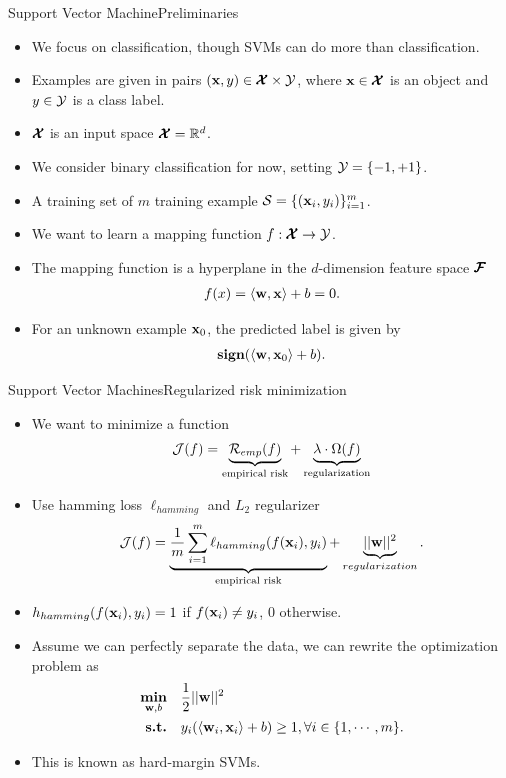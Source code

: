 \documentclass[first=dgreen,second=purple,logo=yellowexc]{aaltoslides}
\begin{document}
{\begin{frame}{Support Vector Machine}{Preliminaries}
	\begin{itemize}
		\item We focus on classification, though SVMs can do more than classification.
		\item Examples are given in pairs $(\mathbf {x},y)\in\pmb {\mathcal{X}}\times\mathcal{Y}$, where $\mathbf {x}\in\pmb {\mathcal{X}}$ is an object and $y\in\mathcal{Y}$ is a class label.
		\item $\pmb {\mathcal{X}}$ is an input space $\pmb {\mathcal{X}}=\mathbb{R}^d$.
		\item We consider binary classification for now, setting $\mathcal{Y}=\{-1,+1\}$.
		\item A training set of $m$ training example $\mathcal{S}=\{(\mathbf {x}_i,y_i)\}_{i=1}^{m}$.
		\item We want to learn a mapping function $f: \pmb {\mathcal{X}}\rightarrow\mathcal{Y}$.
		\item The mapping function is a hyperplane in the $d$-dimension feature space $\pmb {\mathcal{F}}$
		\begin{align*}
			f(x) = \langle \mathbf {w}, \mathbf {x} \rangle+b=0.
		\end{align*}
		\item For an unknown example $\mathbf {x}_0$, the predicted label is given by
		\begin{align*}
			\textbf{sign}(\langle \mathbf {w}, \mathbf {x}_0 \rangle+b).
		\end{align*}
	\end{itemize}
\end{frame}






\begin{frame}{Support Vector Machines}{Regularized risk minimization}
	\begin{itemize}
		\item We want to minimize a function
		\begin{align*}
			\mathcal{J}(f) = \underbrace{\mathcal{R}_{emp}(f)}_{\text{empirical risk}} + \underbrace{\lambda\cdot\Omega(f)}_{\text{regularization}}
		\end{align*}
		\item Use hamming loss $\ell_{hamming}$ and $L_2$ regularizer
		\begin{align*}
			\mathcal{J}(f) = \underbrace{\frac{1}{m}\sum_{i=1}^{m}\ell_{hamming}(f(\mathbf {x}_i),y_i)}_{\text{empirical risk}} + \underbrace{||\mathbf {w}||^2}_{regularization}.
		\end{align*}
		\item $h_{hamming}(f(\mathbf {x}_i),y_i)=1$ if $f(\mathbf {x}_i)\neq y_i$, $0$ otherwise.
		\item Assume we can perfectly separate the data, we can rewrite the optimization problem as
		\begin{align*}
			\underset{\mathbf {w},b}{\textbf{min}} &\quad \frac{1}{2}||\mathbf {w}||^2 \\
			\textbf{s.t.} &\quad y_i(\langle \mathbf {w}_i, \mathbf {x}_i \rangle+b) \ge 1, \forall i\in\{1,\cdots,m\}.
		\end{align*} 
		\item This is known as hard-margin SVMs.
	\end{itemize}
\end{frame}

}
\end{document}
